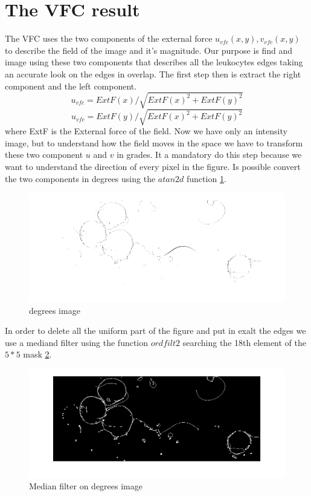\section{The VFC result}
The VFC uses the two components of the external force ${u} _{vfc} ( x,y ) , {v} _{vfc} (x,y)$ to describe the field of the image and it's magnitude. Our purpose is find and image using these two components that describes all the leukocytes edges taking an accurate look on the edges in overlap. The first step then is extract the right component and the left component.
\begin{equation}
{u} _{vfc}=ExtF(x)/\sqrt{ExtF(x)^{2} + ExtF(y)^{2}}
\end{equation}
\begin{equation}
{u} _{vfc}=ExtF(y)/\sqrt{ExtF(x)^{2} + ExtF(y)^{2}}
\end{equation}
where ExtF is the External force of the field. Now we have only an intensity image, but to understand how the field moves in the space we have to transform these two component $ u$ and $ v $ in grades. It a mandatory do this step because we want to understand the direction of every pixel in the figure. Is possible convert the two components in degrees using the $atan2d$ function \ref{fig:angle}.
\begin{figure}
	\begin{center}
		\centering
		\includegraphics[scale=0.5]{img/angle.png}
		\caption{degrees image}
		\label{fig:angle}
	\end{center}
\end{figure}
In order to delete all the uniform part of the figure and put in exalt the edges we use a mediand filter using the function $ordfilt2$ searching the 18th element of the $5 * 5$ mask \ref{fig:Pmedangle}.
\begin{figure}
	\begin{center}
		\centering
		\includegraphics[scale=0.5]{img/PmedAngle.png}
		\caption{Median filter on degrees image}
		\label{fig:Pmedangle}
	\end{center}
\end{figure}
